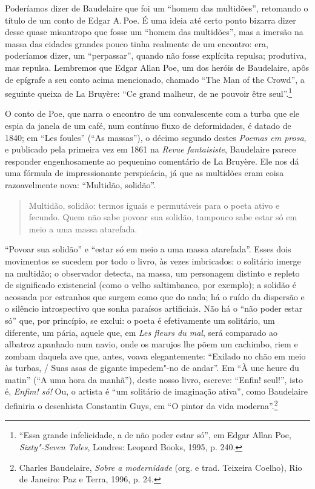 Poderíamos dizer de Baudelaire que foi um ``homem das multidões'', retomando o título de um conto de Edgar A.\,Poe.
É uma ideia até certo ponto bizarra dizer desse quase misantropo que fosse
um “homem das multidões”, mas a imersão na massa das cidades grandes
pouco tinha realmente de um encontro: era, poderíamos dizer, um
 “perpassar”, quando não fosse explícita repulsa; produtiva, mas
repulsa. Lembremos que Edgar Allan Poe, um dos heróis de Baudelaire,
apôs de epígrafe a seu conto acima mencionado, chamado “The Man of the
Crowd”, a seguinte queixa de La Bruyère: “Ce grand malheur, de ne
pouvoir être seul”.\footnote{ “Essa grande infelicidade, a de não poder
estar só”, em Edgar Allan Poe, \textit{Sixty"-Seven Tales}, Londres: Leopard
Books, 1995, p. 240.}

O conto de Poe, que narra o encontro de um convalescente com a turba que
ele espia da janela de um café, num contínuo fluxo de deformidades, é
datado de 1840; em “Les foules” (“As massas”), o décimo segundo destes
\textit{Poemas em prosa}, e publicado pela primeira vez em 1861 na
\textit{Revue fantaisiste}, Baudelaire parece responder engenhosamente
ao pequenino comentário de La Bruyère. Ele nos dá uma fórmula de
impressionante perspicácia, já que as multidões eram coisa
razoavelmente nova: “Multidão, solidão”. 

\begin{quote}
Multidão, solidão: termos iguais e permutáveis para o poeta ativo e
fecundo. Quem não sabe povoar sua solidão, tampouco sabe estar só em
meio a uma massa atarefada.
\end{quote}

“Povoar sua solidão” e “estar só em meio a uma massa atarefada”. Esses
dois movimentos se sucedem por todo o livro, às vezes imbricados: o
solitário imerge na multidão; o observador detecta, na massa, um
personagem distinto e repleto de significado existencial (como o velho
saltimbanco, por exemplo); a solidão é acossada por estranhos que
surgem como que do nada; há o ruído da dispersão e o silêncio
introspectivo que sonha paraísos artificiais. Não há o “não poder estar
só” que, por princípio, se exclui: o poeta é efetivamente um solitário,
um diferente, um pária, aquele que, em \textit{Les fleurs du mal}, será
comparado ao albatroz apanhado num navio, onde os marujos lhe põem um
cachimbo, riem e zombam daquela ave que, antes, voava elegantemente:
“Exilado no chão em meio às turbas, / Suas asas de gigante impedem"-no
de andar”. Em “À une heure du matin” (“A uma hora da manhã”), deste
nosso livro, escreve: “Enfin! seul!”, isto é, \textit{Enfim! só!} Ou,
o artista é “um solitário de imaginação ativa”, como Baudelaire
definiria o desenhista Constantin Guys, em “O pintor da vida
moderna”.\footnote{ Charles Baudelaire, \textit{Sobre a modernidade}
(org. e trad. Teixeira Coelho), Rio de Janeiro: Paz e
Terra, 1996, p. 24.}

